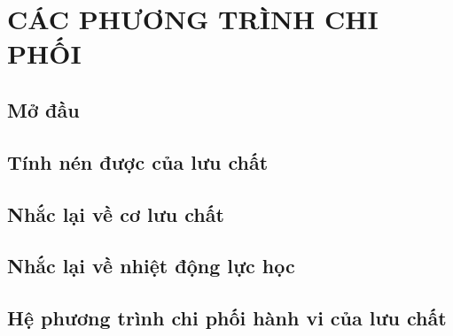 \documentclass[../../main.tex]{subfiles}
\begin{document}
\chapter{CÁC PHƯƠNG TRÌNH CHI PHỐI}
	\section{Mở đầu}
		
	\section{Tính nén được của lưu chất}
		
	\section{Nhắc lại về cơ lưu chất}
		
	\section{Nhắc lại về nhiệt động lực học}
		
	\section{Hệ phương trình chi phối hành vi của lưu chất}
		

\end{document}
